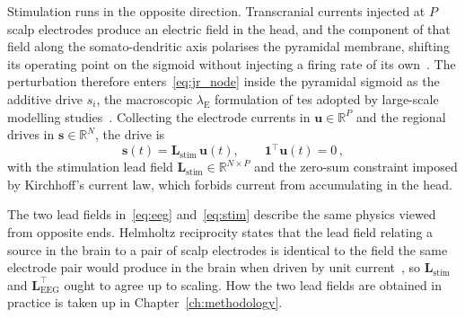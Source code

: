 Stimulation runs in the opposite direction. Transcranial currents injected at $P$ scalp
electrodes produce an electric field in the head, and the component of that field along the
somato-dendritic axis polarises the pyramidal membrane, shifting its operating point on the
sigmoid without injecting a firing rate of its own~\cite{Buzsaki2012}. %
The perturbation therefore enters~\eqref{eq:jr_node} inside the pyramidal sigmoid as the additive drive $s_i$, the
macroscopic $\lambda_\mathrm{E}$ formulation of \ac{tes} adopted by large-scale modelling
studies~\cite{Kunze2016,Merlet2013,Yu2024}. Collecting the electrode currents in %
$\mathbf{u} \in \mathbb{R}^{P}$ and the regional drives in $\mathbf{s} \in \mathbb{R}^{N}$,
the drive is
%
\begin{equation}
    \mathbf{s}(t) = \mathbf{L}_\mathrm{stim}\, \mathbf{u}(t), \qquad
    \mathbf{1}^\top \mathbf{u}(t) = 0 \,,
    \label{eq:stim}
\end{equation}
%
with the stimulation lead field $\mathbf{L}_\mathrm{stim} \in \mathbb{R}^{N \times P}$ and
the zero-sum constraint imposed by Kirchhoff's current law, which forbids current from accumulating in the head.

The two lead fields in~\eqref{eq:eeg} and~\eqref{eq:stim} describe the same physics viewed
from opposite ends. Helmholtz reciprocity states that the lead field relating a source in
the brain to a pair of scalp electrodes is identical to the field the same electrode pair
would produce in the brain when driven by unit current~\cite{Malmivuo1995}, so %
$\mathbf{L}_\mathrm{stim}$ and $\mathbf{L}_\mathrm{EEG}^\top$ ought to agree up to scaling.
How the two lead fields are obtained in practice is taken up in Chapter~\ref{ch:methodology}.

